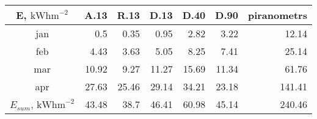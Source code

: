 \begin{tabular}{ | c | r r r r r  r | } \hline
E, $\textrm{kWhm}^{-2}$	&A.13	&R.13	&D.13	&D.40	&D.90 	&piranometrs\\ \hline
jan	&0.5	&0.35	&0.95	&2.82	&3.22		&12.14	\\
feb	&4.43	&3.63	&5.05	&8.25	&7.41		&25.14	\\
mar	&10.92	&9.27	&11.27	&15.69	&11.34		&61.76	\\
apr	&27.63	&25.46	&29.14	&34.21	&23.18		&141.41	\\ \hline
$E_{sum}$, $\textrm{kWhm}^{-2}$
	&43.48	&38.7	&46.41	&60.98	&45.14		&240.46	\\ \hline
\end{tabular}